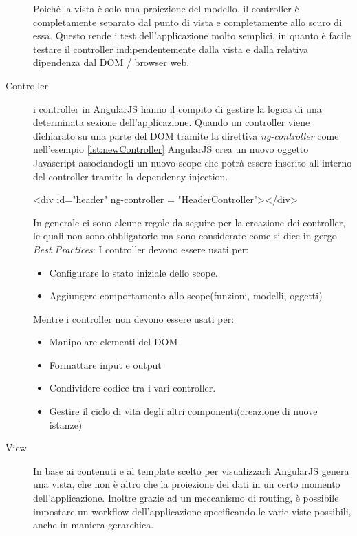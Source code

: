 \begin{description}
Poiché la vista è solo una proiezione del modello, il controller è completamente separato dal punto di vista e completamente allo scuro di essa. Questo rende i test dell'applicazione molto semplici, in quanto è facile testare il controller indipendentemente dalla vista e dalla relativa dipendenza dal DOM / browser web.

\item[Controller] i controller in AngularJS hanno il compito di gestire la logica di una determinata sezione dell'applicazione. Quando un controller viene dichiarato su una parte del DOM tramite la direttiva \emph{ng-controller} come nell'esempio \ref{lst:newController} AngularJS crea un nuovo oggetto Javascript associandogli un nuovo scope che potrà essere inserito all'interno del controller tramite la dependency injection. 

\begin{code}[caption={Associazione tra un elemento del DOM e un controller}, label={lst:newController}]
	<div id="header" ng-controller = "HeaderController"></div>
\end{code}

In generale ci sono alcune regole da seguire per la creazione dei controller, le quali non sono obbligatorie ma sono considerate come si dice in gergo \emph{Best Practices}:
I controller devono essere usati per:

\begin{itemize}
\item Configurare lo stato iniziale dello scope.
\item Aggiungere comportamento allo scope(funzioni, modelli, oggetti)
\end{itemize}
Mentre i controller non devono essere usati per:
\begin{itemize}
\item Manipolare elementi del DOM
\item Formattare input e output
\item Condividere codice tra i vari controller.
\item Gestire il ciclo di vita degli altri componenti(creazione di nuove istanze)
\end{itemize}

\item[View] In base ai contenuti e al template scelto per visualizzarli AngularJS genera una vista, che non è altro che la proiezione dei dati in un certo momento dell'applicazione. Inoltre grazie ad un meccanismo di routing, è possibile impostare un workflow dell'applicazione specificando le varie viste possibili, anche in maniera gerarchica. 


\end{description}
